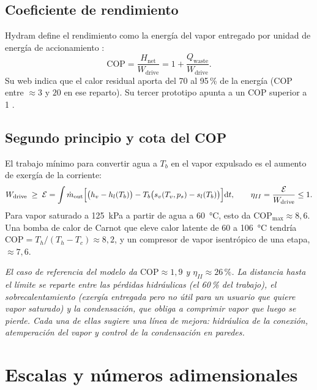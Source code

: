 \documentclass[11pt,a4paper]{article}
\newcommand{\dd}{\mathrm{d}}
\newcommand{\mdot}{\dot m}
\newenvironment{nota}{\par\smallskip\noindent\begin{minipage}{\linewidth}\small\itshape}{\end{minipage}\par\smallskip}
\begin{document}
\subsection{Coeficiente de rendimiento}

Hydram define el rendimiento como la energía del vapor entregado por unidad de energía de accionamiento \cite{hydramweb}:
\begin{equation}
\mathrm{COP} = \frac{H_{\mathrm{net}}}{W_{\mathrm{drive}}} = 1 + \frac{Q_{\mathrm{waste}}}{W_{\mathrm{drive}}}.
\end{equation}
Su web indica que el calor residual aporta del 70 al 95\,\% de la energía (COP entre $\approx3$ y $20$ en ese reparto). Su tercer prototipo apunta a un COP superior a 1 \cite{hydramtech}.

\subsection{Segundo principio y cota del COP}

El trabajo mínimo para convertir agua a $T_b$ en el vapor expulsado es el aumento de exergía de la corriente:
\begin{equation}
W_{\mathrm{drive}} \;\ge\; \mathcal{E} = \int \mdot_{\mathrm{out}}\Bigl[\bigl(h_v - h_l(T_b)\bigr) - T_b\bigl(s_v(T_v,p_s) - s_l(T_b)\bigr)\Bigr]\dd t,
\qquad \eta_{II} = \frac{\mathcal{E}}{W_{\mathrm{drive}}}\le 1 .
\end{equation}
Para vapor saturado a \SI{125}{\kilo\pascal} a partir de agua a \SI{60}{\celsius}, esto da $\mathrm{COP}_{\max}\approx 8{,}6$. Una bomba de calor de Carnot que eleve calor latente de \SI{60}{} a \SI{106}{\celsius} tendría $\mathrm{COP}=T_h/(T_h-T_c)\approx 8{,}2$, y un compresor de vapor isentrópico de una etapa, $\approx 7{,}6$.

\begin{nota}
El caso de referencia del modelo da $\mathrm{COP}\approx 1{,}9$ y $\eta_{II}\approx 26\,\%$. La distancia hasta el límite se reparte entre las pérdidas hidráulicas (el 60\,\% del trabajo), el sobrecalentamiento (exergía entregada pero no útil para un usuario que quiere vapor saturado) y la condensación, que obliga a comprimir vapor que luego se pierde. Cada una de ellas sugiere una línea de mejora: hidráulica de la conexión, atemperación del vapor y control de la condensación en paredes.
\end{nota}

\section{Escalas y números adimensionales}
\end{document}
